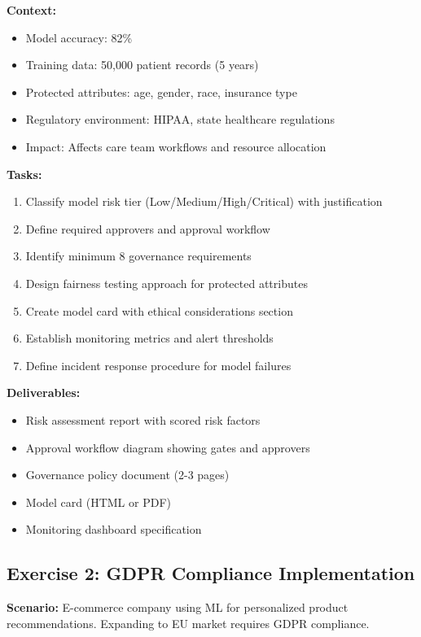 \textbf{Context:}
\begin{itemize}
    \item Model accuracy: 82\%
    \item Training data: 50,000 patient records (5 years)
    \item Protected attributes: age, gender, race, insurance type
    \item Regulatory environment: HIPAA, state healthcare regulations
    \item Impact: Affects care team workflows and resource allocation
\end{itemize}

\textbf{Tasks:}
\begin{enumerate}
    \item Classify model risk tier (Low/Medium/High/Critical) with justification
    \item Define required approvers and approval workflow
    \item Identify minimum 8 governance requirements
    \item Design fairness testing approach for protected attributes
    \item Create model card with ethical considerations section
    \item Establish monitoring metrics and alert thresholds
    \item Define incident response procedure for model failures
\end{enumerate}

\textbf{Deliverables:}
\begin{itemize}
    \item Risk assessment report with scored risk factors
    \item Approval workflow diagram showing gates and approvers
    \item Governance policy document (2-3 pages)
    \item Model card (HTML or PDF)
    \item Monitoring dashboard specification
\end{itemize}

\subsection{Exercise 2: GDPR Compliance Implementation}

\textbf{Scenario:} E-commerce company using ML for personalized product recommendations. Expanding to EU market requires GDPR compliance.

